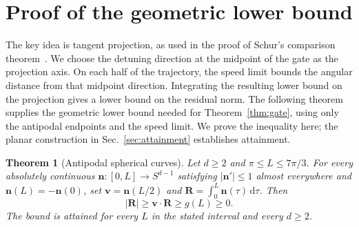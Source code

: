 \documentclass[12pt]{iopjournal}
\newtheorem{theorem}{Theorem}
\newcommand{\dd}{\mathrm{d}}
\newcommand{\nvec}{\mathbf n}
\newcommand{\Rvec}{\mathbf R}
\newcommand{\vvec}{\mathbf v}
\begin{document}
\section{Proof of the geometric lower bound}
\label{sec:midpoint}

The key idea is tangent projection, as used in the proof of Schur's
comparison theorem~\cite{sullivan2008}. We choose the detuning direction at
the midpoint of the gate as the projection axis. On each half of the
trajectory, the speed limit bounds the angular distance from that
midpoint direction. Integrating the resulting lower bound on the
projection gives a lower bound on the residual norm.
The following theorem supplies the geometric lower bound needed for
Theorem~\ref{thm:gate}, using only the antipodal endpoints and the speed
limit. We prove the inequality here; the planar construction in
Sec.~\ref{sec:attainment} establishes attainment.

\begin{theorem}[Antipodal spherical curves]
\label{thm:sphere}
Let $d\ge2$ and $\pi\le L\le7\pi/3$. For every absolutely continuous
$\nvec:[0,L]\to S^{d-1}$ satisfying $|\nvec'|\le1$ almost everywhere
and $\nvec(L)=-\nvec(0)$, set $\vvec=\nvec(L/2)$ and
$\Rvec=\int_0^L\nvec(\tau)\,\dd\tau$. Then
\begin{equation}
 |\Rvec|\ge\vvec\cdot\Rvec\ge g(L)\ge0.
 \label{eq:sphere-bound}
\end{equation}
The bound is attained for every $L$ in the stated interval and every
$d\ge2$.
\end{theorem}
\end{document}
